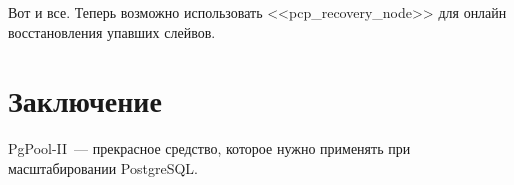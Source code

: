 \begin{itemize}
\end{itemize}

Вот и все. Теперь возможно использовать <<pcp\_recovery\_node>> для онлайн восстановления упавших слейвов.


\section{Заключение}
PgPool-II~--- прекрасное средство, которое нужно применять при масштабировании PostgreSQL.

